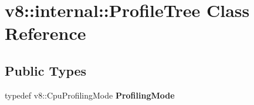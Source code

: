 \hypertarget{classv8_1_1internal_1_1ProfileTree}{}\section{v8\+:\+:internal\+:\+:Profile\+Tree Class Reference}
\label{classv8_1_1internal_1_1ProfileTree}
\subsection*{Public Types}
\begin{DoxyCompactItemize}
\item 
\mbox{\label{classv8_1_1internal_1_1ProfileTree_a3c44580881c9acd619dc36ac30776ad4}} 
typedef v8\+::\+Cpu\+Profiling\+Mode {\bfseries Profiling\+Mode}
\end{DoxyCompactItemize}
